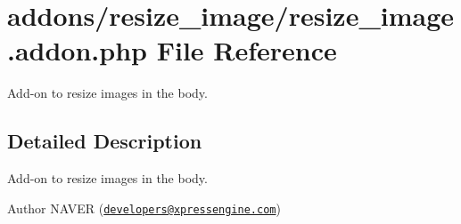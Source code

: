 \hypertarget{resize__image_8addon_8php}{}\section{addons/resize\+\_\+image/resize\+\_\+image.addon.\+php File Reference}
\label{resize__image_8addon_8php}


Add-\/on to resize images in the body.  




\subsection{Detailed Description}
Add-\/on to resize images in the body. 

\begin{DoxyAuthor}{Author}
N\+A\+V\+ER (\href{mailto:developers@xpressengine.com}{\tt developers@xpressengine.\+com}) 
\end{DoxyAuthor}
